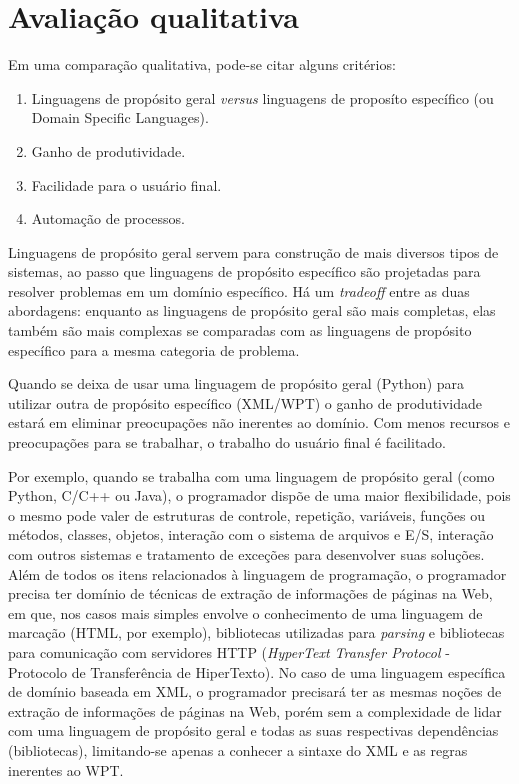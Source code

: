 \section{Avaliação qualitativa}

Em uma comparação qualitativa, pode-se citar alguns critérios:

\begin{enumerate}
	\item Linguagens de propósito geral \emph{versus} linguagens de proposíto específico (ou Domain Specific Languages).
	\item Ganho de produtividade.
	\item Facilidade para o usuário final.
	\item Automação de processos.
\end{enumerate}

Linguagens de propósito geral servem para construção de mais diversos tipos de sistemas, ao passo que linguagens de propósito específico são projetadas para resolver problemas em um domínio específico. Há um \emph{tradeoff} entre as duas abordagens: enquanto as linguagens de propósito geral são mais completas, elas também são mais complexas se comparadas com as linguagens de propósito específico para a mesma categoria de problema.

Quando se deixa de usar uma linguagem de propósito geral (Python) para utilizar outra de propósito específico (XML/WPT) o ganho de produtividade estará em eliminar preocupações não inerentes ao domínio. Com menos recursos e preocupações para se trabalhar, o trabalho do usuário final é facilitado.

Por exemplo, quando se trabalha com uma linguagem de propósito geral (como Python, C/C++ ou Java), o programador dispõe de uma maior flexibilidade, pois o mesmo pode valer de estruturas de controle, repetição, variáveis, funções ou métodos, classes, objetos, interação com o sistema de arquivos e E/S, interação com outros sistemas e tratamento de exceções para desenvolver suas soluções. Além de todos os itens relacionados à linguagem de programação, o programador precisa ter domínio de técnicas de extração de informações de páginas na Web, em que, nos casos mais simples envolve o conhecimento de uma linguagem de marcação (HTML, por exemplo), bibliotecas utilizadas para \emph{parsing} e bibliotecas para comunicação com servidores HTTP (\emph{HyperText Transfer Protocol} - Protocolo de Transferência de HiperTexto). No caso de uma linguagem específica de domínio baseada em XML, o programador precisará ter as mesmas noções de extração de informações de páginas na Web, porém sem a complexidade de lidar com uma linguagem de propósito geral e todas as suas respectivas dependências (bibliotecas), limitando-se apenas a conhecer a sintaxe do XML e as regras inerentes ao WPT.

